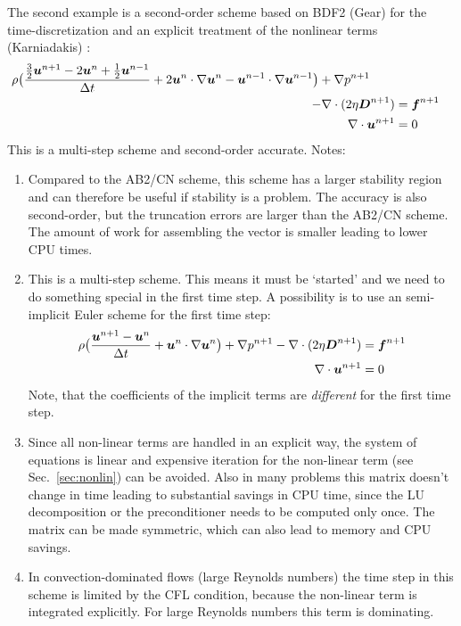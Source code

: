 The second example is a second-order scheme based on BDF2 (Gear) for the time-discretization and an explicit treatment of
the nonlinear terms (Karniadakis) \cite{Karniadakis91,Hulsen96}:
\begin{align}
 \rho \big( \frac{\frac32\boldsymbol{u}^{n+1}-2\boldsymbol{u}^n + \frac12\boldsymbol{u}^{n-1}}{\Delta t} +
     2\boldsymbol{u}^n \cdot \nabla \boldsymbol{u}^{n} -
     \boldsymbol{u}^{n-1} \cdot \nabla \boldsymbol{u}^{n-1} \big) 
      + \nabla p^{n+1} 
       \qquad\notag\\
         - \nabla \cdot ( 2 \eta \boldsymbol{D}^{n+1}) &=\boldsymbol{f}^{n+1}\\
\nabla \cdot \boldsymbol{u}^{n+1} &= 0
\label{eq:NS_Kar2}
\end{align}
This is a multi-step scheme and second-order accurate.
Notes:
\begin{enumerate}
   \item Compared to the AB2/CN scheme, this scheme has a larger stability region and can therefore be useful if stability is
         a problem. The accuracy is also second-order, but the truncation errors are larger than the AB2/CN scheme.
         The amount of work for assembling the vector is smaller leading to lower CPU times. 
   \item This is a multi-step scheme. This means it must be `started' and we need to do something special in
         the first time step. A possibility is to use an semi-implicit Euler scheme for the first time step:
\begin{align}
 \rho \big( \frac{\boldsymbol{u}^{n+1}-\boldsymbol{u}^n}{\Delta t} +
     \boldsymbol{u}^n \cdot \nabla \boldsymbol{u}^{n} \big) 
      + \nabla p^{n+1} 
         - \nabla \cdot ( 2 \eta \boldsymbol{D}^{n+1})  &=\boldsymbol{f}^{n+1}\\
\nabla \cdot \boldsymbol{u}^{n+1} &= 0
\label{eq:NS_kar2_firststep}
\end{align}
   Note, that the coefficients of the implicit terms are \emph{different} for the first time step. 
   \item Since all non-linear terms are handled in an explicit way, the system of equations is linear and
         expensive iteration for the non-linear term (see Sec.~\ref{sec:nonlin}) can be avoided.
        Also in many problems this matrix doesn't change in time
  leading to substantial savings in CPU time, since the LU decomposition or the preconditioner needs to be computed only once.
        The matrix can be made symmetric, which can also lead to memory and CPU savings.
   \item In convection-dominated flows (large Reynolds numbers) the time step in this scheme is limited by the CFL condition, because the non-linear term is integrated explicitly. For large Reynolds numbers this term is dominating.
\end{enumerate}

